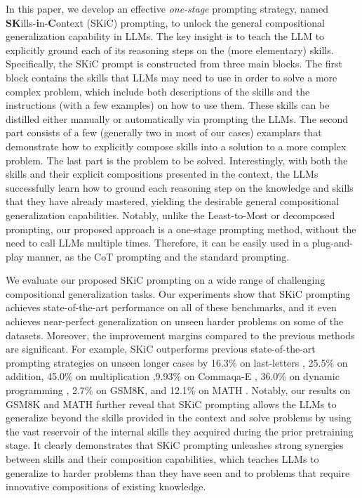 In this paper, we develop an effective \emph{one-stage} prompting strategy, named \textbf{SK}ills-\textbf{i}n-\textbf{C}ontext (SKiC) prompting, to unlock the general compositional generalization capability in LLMs. The key insight is to teach the LLM to explicitly ground each of its reasoning steps on the (more elementary) skills. Specifically, the SKiC prompt is constructed from three main blocks. The first block contains the skills that LLMs may need to use in order to solve a more complex problem, which include both descriptions of the skills and the instructions (with a few examples) on how to use them. These skills can be distilled either manually or automatically via prompting the LLMs. The second part consists of a few (generally two in most of our cases) examplars that demonstrate how to explicitly compose skills into a solution to a more complex problem. The last part is the problem to be solved. Interestingly, with both the skills and their explicit compositions presented in the context, the LLMs successfully learn how to ground each reasoning step on the knowledge and skills that they have already mastered, yielding the desirable general compositional generalization capabilities. Notably, unlike the Least-to-Most or decomposed prompting, our proposed approach is a one-stage prompting method, without the need to call LLMs multiple times. Therefore, it can be easily used in a plug-and-play manner, as the CoT prompting and the standard prompting.




We evaluate our proposed SKiC prompting on a wide range of challenging compositional generalization tasks. Our experiments show that SKiC prompting achieves state-of-the-art performance on all of these benchmarks, and it even achieves near-perfect generalization on unseen harder problems on some of the datasets. Moreover, the improvement margins compared to the previous methods are significant. For example, SKiC outperforms previous state-of-the-art prompting strategies on unseen longer cases by 16.3\% on last-letters \citep{zhou2022least}, 25.5\% on addition, 45.0\% on multiplication \citep{dziri2023faith},9.93\% on Commaqa-E \citep{khot2021hey}, 36.0\% on dynamic programming \citep{dziri2023faith}, 2.7\% on GSM8K\citep{cobbe2021training}, and 12.1\% on MATH \citep{hendrycks2021measuring}. Notably, our results on GSM8K and MATH further reveal that SKiC prompting allows the LLMs to generalize beyond the skills provided in the context and solve problems by using the vast reservoir of the internal skills they acquired during the prior pretraining stage. It clearly demonstrates that SKiC prompting unleashes strong synergies between skills and their composition capabilities, which teaches LLMs to generalize to harder problems than they have seen and to problems that require innovative compositions of existing knowledge.


